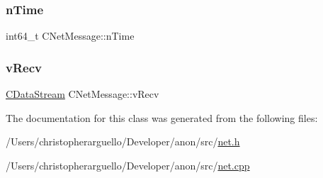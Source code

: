 \mbox{\label{class_c_net_message_a99d5bbca862ac4b7a88b71a7b679decc}} 
\subsubsection{\texorpdfstring{n\+Time}{nTime}}
{\footnotesize\ttfamily int64\+\_\+t C\+Net\+Message\+::n\+Time}

\mbox{\label{class_c_net_message_a1a25c16099d01362e1663390a2e06d1a}} 
\subsubsection{\texorpdfstring{v\+Recv}{vRecv}}
{\footnotesize\ttfamily \mbox{\hyperlink{class_c_data_stream}{C\+Data\+Stream}} C\+Net\+Message\+::v\+Recv}



The documentation for this class was generated from the following files\+:\begin{DoxyCompactItemize}
\item 
/\+Users/christopherarguello/\+Developer/anon/src/\mbox{\hyperlink{net_8h}{net.\+h}}\item 
/\+Users/christopherarguello/\+Developer/anon/src/\mbox{\hyperlink{net_8cpp}{net.\+cpp}}\end{DoxyCompactItemize}
